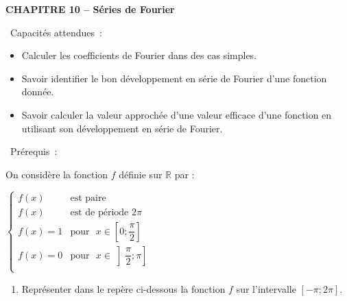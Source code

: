 \documentclass[11pt,a4paper]{article}
\newcommand{\bpre}[1]
{\begin{bclogo}[couleur = white,logo=, barre=none, arrondi = 0.1]
{~Prérequis~:}
~~
{#1}
~~
\end{bclogo}}
\begin{document}
\begin{mybox}
\begin{center}
\textbf{\LARGE CHAPITRE 10 -- Séries de Fourier}
\end{center}
\end{mybox}

\vfill 

\begin{center}
\begin{minipage}{14cm}
\begin{bclogo}[couleur = white, arrondi = 0.1]
{~Capacités attendues~:}
~~
\begin{itemize}
\item Calculer les coefficients de Fourier dans des cas simples.
\item Savoir identifier le bon développement en série de Fourier d'une fonction donnée.
\item Savoir calculer la valeur approchée d'une valeur efficace d'une fonction en utilisant son développement en série de Fourier.
\end{itemize}
\end{bclogo}
\end{minipage}
\end{center}

\vfill 


\bpre{%
On considère la fonction $f$ définie sur $\mathbb{R}$ par :
\begin{center}
$\begin{cases}
f(x) &\textrm{est paire}\\
f(x)&\textrm {est de période }2\pi \\
f(x)=1  & \textrm {pour~~} x \in \left[0;\dfrac{\pi}{2} \right]\\
f(x)=0  & \textrm {pour~~} x \in \left]\dfrac{\pi}{2};\pi \right]\\
\end{cases}$
\end{center}
\begin{enumerate}
    \item Représenter dans le repère ci-dessous la fonction $f$ sur l'intervalle $[-\pi;2\pi]$.
\end{enumerate}
}

\vfill 
\end{document}
